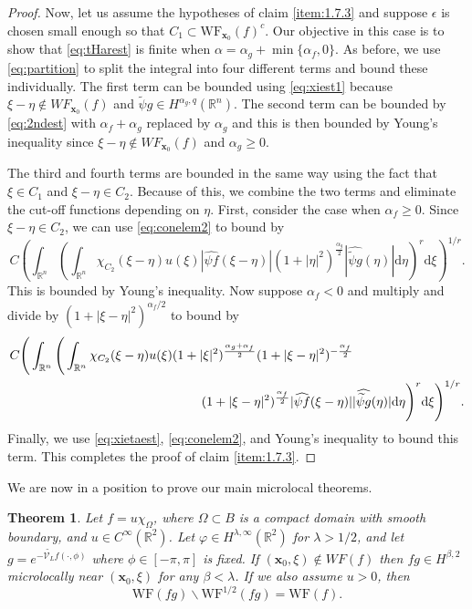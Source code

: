 \documentclass[a4paper,12pt]{amsart}
\numberwithin{equation}{section}
\theoremstyle{plain}
\newtheorem{theorem}{Theorem}
\numberwithin{theorem}{section}
\theoremstyle{definition}
\theoremstyle{remark}
\theoremstyle{remark}
\theoremstyle{remark}
\newcommand{\dd}{\mathrm{d}}  %
\newcommand{\WF}{\mathrm{WF}}                         %
\newcommand{\vx}{{\mathbf{x}}}
\begin{document}
\begin{proof}
    Now, let us assume the hypotheses of claim \eqref{item:1.7.3} and suppose $\epsilon$ is chosen small enough so that $C_1 \subset \WF_{\vx_0}(f)^c$. Our objective in this case is to show that \eqref{eq:tHarest} is finite when $\alpha = \alpha_g + \min\{\alpha_f,0\}$. As before, we use \eqref{eq:partition} to split the integral into four different terms and bound these individually. The first term can be bounded using \eqref{eq:xiest1} because $\xi-\eta \notin WF_{\vx_0}(f)$ and $\widetilde{\psi} g \in H^{\alpha_g,q}(\mathbb{R}^n)$. The second term can be bounded by \eqref{eq:2ndest} with $\alpha_f + \alpha_g$ replaced by $\alpha_g$ and this is then bounded by Young's inequality since $\xi-\eta \notin WF_{\vx_0}(f)$ and $\alpha_g \geq 0$.

    The third and fourth terms are bounded in the same way using the fact that $\xi \in C_1$ and $\xi-\eta \in C_2$. Because of this, we combine the two terms and eliminate the cut-off functions depending on $\eta$. First, consider the case when $\alpha_f \geq 0$. Since $\xi-\eta \in C_2$, we can use \ref{eq:conelem2} to bound by 
    \[
    C \left (\int_{\mathbb{R}^n} \left ( \int_{\mathbb{R}^n} \chi_{C_2}(\xi-\eta) u(\xi) |\widehat{\psi f}(\xi-\eta)| (1+|\eta|^2)^{\frac{\alpha_g}{2}}|\widehat{\widetilde{\psi} g}(\eta)| \dd \eta \right )^r \dd \xi \right )^{1/r}.
    \]
    This is bounded by Young's inequality. Now suppose $\alpha_f<0$ and multiply and divide by $(1+|\xi-\eta|^2)^{\alpha_f/2}$ to bound by
    \[
    \begin{split}
    & C \Bigg (\int_{\mathbb{R}^n} \Bigg ( \int_{\mathbb{R}^n} \chi_{C_2}(\xi-\eta) u(\xi) (1+|\xi|^2)^{\frac{\alpha_g + \alpha_f}{2}} (1+|\xi-\eta|^2)^{-\frac{\alpha_f}{2}}\\
    & \hskip15em (1+|\xi-\eta|^2)^{\frac{\alpha_f}{2}}|\widehat{\psi f}(\xi-\eta)||\widehat{\widetilde{\psi} g}(\eta)| \dd \eta \Bigg )^r \dd \xi \Bigg )^{1/r}.
    \end{split}
    \]
    Finally, we use \eqref{eq:xietaest}, \eqref{eq:conelem2}, and Young's inequality to bound this term. This completes the proof of claim \eqref{item:1.7.3}.
    
\end{proof}

We are now in a position to prove our main microlocal theorems.

\begin{theorem}\label{main_thm_1}
Let $f = u\chi_{\Omega}$, where $\Omega \subset B$ is a compact domain with smooth boundary, and $u \in C^\infty(\mathbb{R}^2)$. Let $\varphi \in H^{\lambda,\infty}(\mathbb{R}^2)$ for $\lambda > 1/2$, and let $g = e^{ -\widetilde{\mathcal{V}_L}f(\cdot,\phi) }$ where $\phi \in [-\pi, \pi]$ is fixed. If $(\vx_0,\xi) \notin WF(f)$ then $fg \in H^{\beta,2}$ microlocally near $(\vx_0,\xi)$ for any $\beta < \lambda$. If we also assume $u>0$, then
\begin{equation}
\WF(fg)\backslash \WF^{1/2}(fg) = \WF(f).
\end{equation}
\end{theorem}
\end{document}
